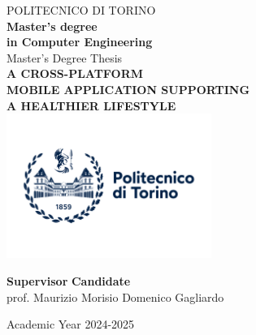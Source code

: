 \begin{titlepage}
    
    \begin{center}
    
    {\huge POLITECNICO DI TORINO}\\[1.5cm]
    \textbf{Master’s degree\\in Computer Engineering}\\[3cm]
    
    {\Large Master's Degree Thesis}\\[0.5cm]
    \textbf{\LARGE A CROSS-PLATFORM\\[-0.2cm] MOBILE APPLICATION SUPPORTING\\[0.2cm] A HEALTHIER LIFESTYLE}\\[2cm]
    \includegraphics[width=0.5\textwidth]{./images/logoPoliTo_with_name_2021.jpg}
    \vspace{2cm}
    
    
    \begin{minipage}{0.85\textwidth}
    \begin{flushleft}\large
    \textbf{Supervisor} \hfill \textbf{Candidate}\\
    prof. Maurizio Morisio \hfill Domenico Gagliardo\\
    \end{flushleft}
    \end{minipage}
    
    \vfill
    
    Academic Year 2024-2025
    \end{center}
    
    \restoregeometry %
    
\end{titlepage}

\begin{titlepage}
    
\tableofcontents

\end{titlepage}
